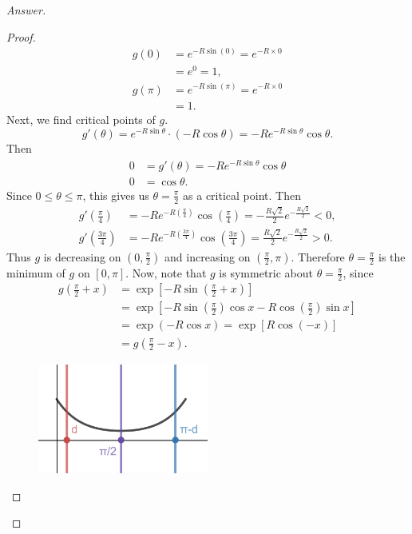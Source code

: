 \documentclass[12pt]{article}
\newcommand\paren[1]{\left( #1 \right)}
\newcommand{\sqbrack}[1]{\left [ #1 \right ]}
\theoremstyle{definition}
\begin{document}
\begin{enumerate}
\begin{proof}[Answer]
\begin{proof}
            \begin{align*}
                g(0) & =  e^{ -R \sin(0) } = e^{-R \times 0} \\
                & = e^0 = 1, \\
                g(\pi) & =  e^{ -R \sin \paren{ \pi } } = e^{-R \times 0} \\
                & = 1.
            \end{align*}
            Next, we find critical points of $g$. 
            \[
                g'(\theta) = e^{-R \sin \theta} \cdot \paren{ -R \cos \theta } = -R e^{-R \sin \theta} \cos \theta.
            \]
            Then 
            \begin{align*}
                0 & = g'(\theta) = -R e^{-R \sin \theta} \cos \theta \\
                0 & = \cos \theta.
            \end{align*}
            Since $0 \leq \theta \leq \pi$, this gives us $\theta = \frac{\pi}{2}$ as a critical point. Then 
            \begin{align*}
                g' \paren{ \frac{\pi}{4} } & = -R e^{-R \paren{ \frac{\pi}{4} } } \cos \paren{ \frac{\pi}{4} } = -\frac{R \sqrt{2}}{2} e^{- \frac{R\sqrt{2}}{2} } < 0 , \\
                g' \paren{ \frac{3\pi}{4} } & = -R e^{-R \paren{ \frac{3\pi}{4} } } \cos \paren{ \frac{3\pi}{4} } = \frac{R \sqrt{2}}{2} e^{- \frac{R\sqrt{2}}{2} } > 0.
            \end{align*}
            Thus $g$ is decreasing on $ \paren{ 0 , \frac{\pi}{2} }$ and increasing on $\paren{ \frac{\pi}{2} , \pi }$. Therefore $\theta = \frac{\pi}{2}$ is the minimum of $g$ on $[0,\pi]$. Now, note that $g$ is symmetric about $\theta = \frac{\pi}{2}$, since
            \begin{align*}
                g \paren{ \frac{\pi}{2} + x } & = \exp \sqbrack{ -R \sin \paren{ \frac{\pi}{2} + x } } \\
                & = \exp \sqbrack{ -R \sin \paren{ \frac{\pi}{2} } \cos x - R \cos \paren{ \frac{\pi}{2} } \sin x } \\
                & = \exp \paren{ -R \cos x } = \exp \sqbrack{ R \cos \paren{ -x } } \\
                & = g \paren{ \frac{\pi}{2} - x }.
            \end{align*}
            \begin{figure}[H]
                \centering
                \includegraphics[width = 0.5\textwidth]{8.png}

\end{figure}
\end{proof}
\end{proof}
\end{enumerate}
\end{document}
